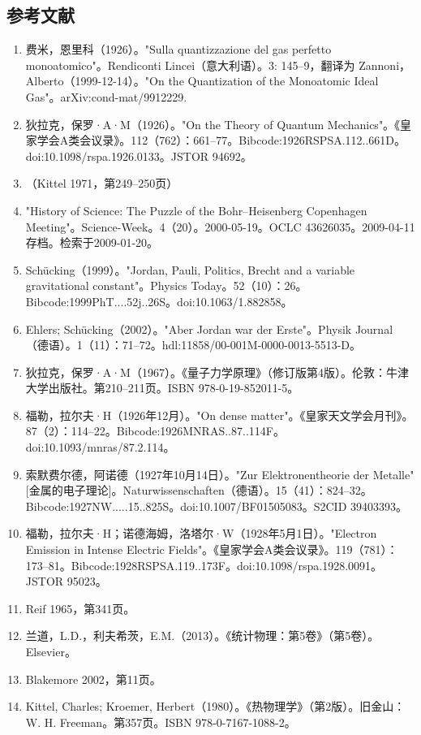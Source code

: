 \subsection{参考文献}  
\begin{enumerate}
\item 费米，恩里科（1926）。"Sulla quantizzazione del gas perfetto monoatomico"。Rendiconti Lincei（意大利语）。3: 145–9，翻译为 Zannoni，Alberto（1999-12-14）。"On the Quantization of the Monoatomic Ideal Gas"。arXiv:cond-mat/9912229.  
\item 狄拉克，保罗·A·M（1926）。"On the Theory of Quantum Mechanics"。《皇家学会A类会议录》。112（762）：661–77。Bibcode:1926RSPSA.112..661D。doi:10.1098/rspa.1926.0133。JSTOR 94692。  
\item （Kittel 1971，第249–250页）  
\item "History of Science: The Puzzle of the Bohr–Heisenberg Copenhagen Meeting"。Science-Week。4（20）。2000-05-19。OCLC 43626035。2009-04-11存档。检索于2009-01-20。  
\item Schücking（1999）。"Jordan, Pauli, Politics, Brecht and a variable gravitational constant"。Physics Today。52（10）：26。Bibcode:1999PhT....52j..26S。doi:10.1063/1.882858。  
\item Ehlers; Schücking（2002）。"Aber Jordan war der Erste"。Physik Journal（德语）。1（11）：71–72。hdl:11858/00-001M-0000-0013-5513-D。  
\item 狄拉克，保罗·A·M（1967）。《量子力学原理》（修订版第4版）。伦敦：牛津大学出版社。第210–211页。ISBN 978-0-19-852011-5。  
\item 福勒，拉尔夫·H（1926年12月）。"On dense matter"。《皇家天文学会月刊》。87（2）：114–22。Bibcode:1926MNRAS..87..114F。doi:10.1093/mnras/87.2.114。  
\item 索默费尔德，阿诺德（1927年10月14日）。"Zur Elektronentheorie der Metalle" [金属的电子理论]。Naturwissenschaften（德语）。15（41）：824–32。Bibcode:1927NW.....15..825S。doi:10.1007/BF01505083。S2CID 39403393。  
\item 福勒，拉尔夫·H；诺德海姆，洛塔尔·W（1928年5月1日）。"Electron Emission in Intense Electric Fields"。《皇家学会A类会议录》。119（781）：173–81。Bibcode:1928RSPSA.119..173F。doi:10.1098/rspa.1928.0091。JSTOR 95023。  
\item Reif 1965，第341页。  
\item 兰道，L.D.，利夫希茨，E.M.（2013）。《统计物理：第5卷》（第5卷）。Elsevier。
\item Blakemore 2002，第11页。  
\item Kittel, Charles; Kroemer, Herbert（1980）。《热物理学》（第2版）。旧金山：W. H. Freeman。第357页。ISBN 978-0-7167-1088-2。  

\end{enumerate}
